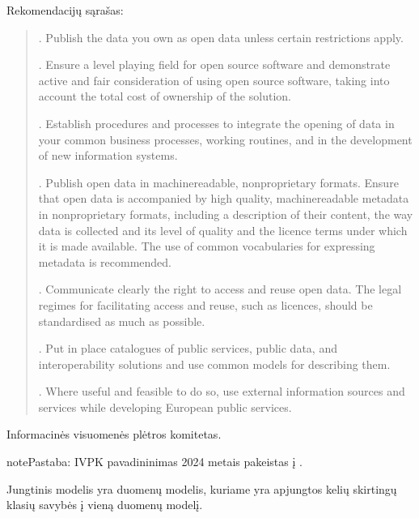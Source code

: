 \documentclass[letterpaper,10pt,lithuanian]{sphinxmanual}
\begin{document}
\begin{description}
\sphinxAtStartPar
Rekomendacijų sąrašas:
\begin{quote}

. Publish the data you own as open data unless certain restrictions
apply.

. Ensure a level playing field for open source software and
demonstrate active and fair consideration of using open source
software, taking into account the total cost of ownership of the
solution.

. Establish procedures and processes to integrate the opening of
data in your common business processes, working routines, and in the
development of new information systems.

. Publish open data in machine\sphinxhyphen{}readable, non\sphinxhyphen{}proprietary formats.
Ensure that open data is accompanied by high quality,
machine\sphinxhyphen{}readable metadata in non\sphinxhyphen{}proprietary formats, including a
description of their content, the way data is collected and its
level of quality and the licence terms under which it is made
available. The use of common vocabularies for expressing metadata is
recommended.

. Communicate clearly the right to access and reuse open data. The
legal regimes for facilitating access and reuse, such as licences,
should be standardised as much as possible.

. Put in place catalogues of public services, public data, and
interoperability solutions and use common models for describing
them.

. Where useful and feasible to do so, use external information
sources and services while developing European public services.
\end{quote}

\sphinxAtStartPar
Informacinės visuomenės plėtros komitetas.

\begin{sphinxadmonition}{note}{Pastaba:}
\sphinxAtStartPar
IVPK pavadininimas 2024 metais pakeistas į {\hyperref[\detokenize{savokos:term-VSSA}]{}}.
\end{sphinxadmonition}

\sphinxAtStartPar
Jungtinis modelis yra duomenų modelis, kuriame yra apjungtos kelių
skirtingų klasių savybės į vieną duomenų modelį.


\end{description}
\end{document}
